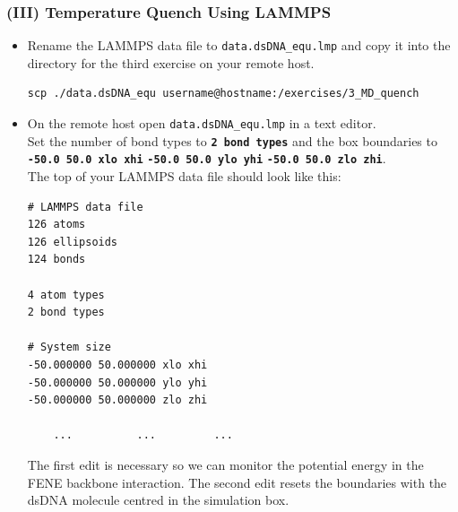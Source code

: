 \documentclass[slidestop,compress,9pt]{beamer}
\begin{document}
\begin{frame}[fragile]
\frametitle{(III) Temperature Quench Using LAMMPS}

\small

\begin{itemize}
\item Rename the LAMMPS data file to \texttt{data.dsDNA\_equ.lmp} and copy it into the directory for the third exercise on your remote host.

\begin{lstlisting}
scp ./data.dsDNA_equ username@hostname:/exercises/3_MD_quench
\end{lstlisting}

\item On the remote host open \texttt{data.dsDNA\_equ.lmp} in a text editor.\\
Set the number of bond types to \textbf{\texttt{2 bond types}} and the box boundaries to\\
\textbf{\texttt{-50.0 50.0 xlo xhi}} \textbf{\texttt{-50.0 50.0 ylo yhi}}
\textbf{\texttt{-50.0 50.0 zlo zhi}}.\\
The top of your LAMMPS data file should look like this:
\linespread{0.4}
\begin{lstlisting}
# LAMMPS data file
126 atoms
126 ellipsoids
124 bonds

4 atom types
2 bond types

# System size
-50.000000 50.000000 xlo xhi
-50.000000 50.000000 ylo yhi
-50.000000 50.000000 zlo zhi

    ...          ...         ... 
\end{lstlisting}
The first edit is necessary so we can monitor the potential energy in the FENE backbone interaction. The second edit resets the boundaries with the dsDNA molecule centred in the simulation box.

\end{itemize}

\end{frame}
\end{document}
